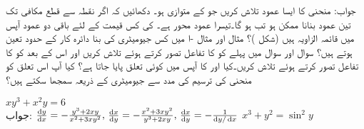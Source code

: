 جواب:\quad
{}
منحنی  کا ایسا عمود تلاش کریں جو  کے متوازی ہو۔
دکھائیں کہ اگر نقطہ  سے  قطع مکافی  تک تین عمود بنانا ممکن ہو تب  ہو گا۔تیسرا عمود  محور ہے۔ کی کس قیمت کے لئے باقی دو عمود آپس میں قائمہ الزاویہ ہیں (شکل )؟
مثال  اور مثال -ا میں کس جیومیٹری کی بنا دائرہ کار کے حدود تعین ہوتے ہیں؟
سوال  اور سوال  میں پہلے  کو  کا تفاعل تصور کرتے ہوئے  تلاش کریں اور اس کے بعد  کو  کا تفاعل تصور کرتے ہوئے  تلاش کریں۔کیا  اور  کا آپس میں کوئی تعلق پایا جاتا ہے؟ کیا آپ اس تعلق کو منحنی کی ترسیم کی مدد سے جیومیٹری کے ذریعہ سمجھا سکتے ہیں؟

$xy^3+x^2y=6$ \\
جواب:\quad
$\tfrac{\dif y}{\dif x}=-\tfrac{y^3+2xy}{x^2+3xy^2},\,\tfrac{\dif x}{\dif y}=-\tfrac{x^2+3xy^2}{y^3+2xy},\, \tfrac{\dif x}{\dif y}=-\tfrac{1}{\dif y/\dif x}$
$x^3+y^2=\sin^2 y$

